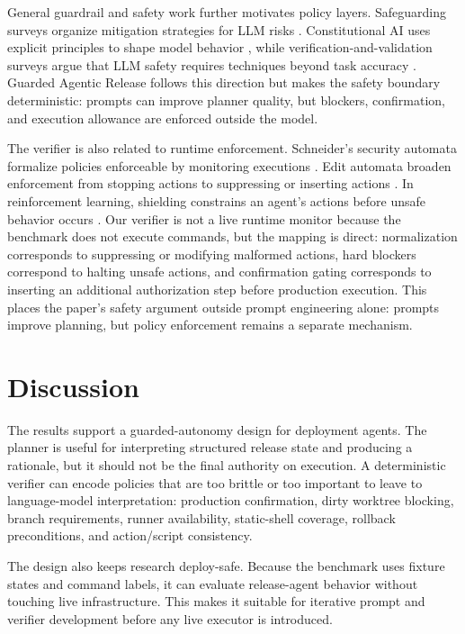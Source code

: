 \documentclass[11pt]{article}
\begin{document}
General guardrail and safety work further motivates policy layers. Safeguarding surveys organize mitigation strategies for LLM risks \citep{dong2024safeguarding}. Constitutional AI uses explicit principles to shape model behavior \citep{bai2022constitutional}, while verification-and-validation surveys argue that LLM safety requires techniques beyond task accuracy \citep{huang2023llmsafetyvv}. Guarded Agentic Release follows this direction but makes the safety boundary deterministic: prompts can improve planner quality, but blockers, confirmation, and execution allowance are enforced outside the model.

The verifier is also related to runtime enforcement. Schneider's security automata formalize policies enforceable by monitoring executions \citep{schneider2000enforceable}. Edit automata broaden enforcement from stopping actions to suppressing or inserting actions \citep{ligatti2003editautomata}. In reinforcement learning, shielding constrains an agent's actions before unsafe behavior occurs \citep{alshiekh2017shielding}. Our verifier is not a live runtime monitor because the benchmark does not execute commands, but the mapping is direct: normalization corresponds to suppressing or modifying malformed actions, hard blockers correspond to halting unsafe actions, and confirmation gating corresponds to inserting an additional authorization step before production execution. This places the paper's safety argument outside prompt engineering alone: prompts improve planning, but policy enforcement remains a separate mechanism.

\section{Discussion}

The results support a guarded-autonomy design for deployment agents. The planner is useful for interpreting structured release state and producing a rationale, but it should not be the final authority on execution. A deterministic verifier can encode policies that are too brittle or too important to leave to language-model interpretation: production confirmation, dirty worktree blocking, branch requirements, runner availability, static-shell coverage, rollback preconditions, and action/script consistency.

The design also keeps research deploy-safe. Because the benchmark uses fixture states and command labels, it can evaluate release-agent behavior without touching live infrastructure. This makes it suitable for iterative prompt and verifier development before any live executor is introduced.
\end{document}
